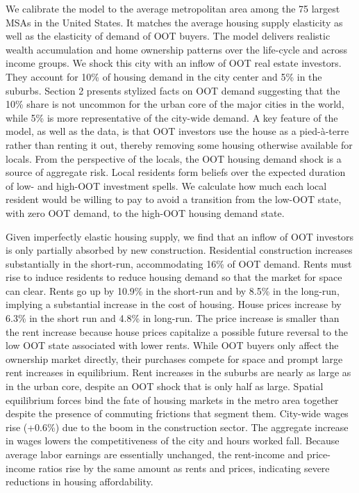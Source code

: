 \documentclass[letterpaper,12pt,dvipsnames,usenames]{article}
\theoremstyle{definition}
\begin{document}
\begin{spacing}{1.25}
We calibrate the model to the average metropolitan area among the 75 largest MSAs in the United States. It matches the average housing supply elasticity as well as the elasticity of demand of OOT buyers. The model delivers realistic wealth accumulation and home ownership patterns over the life-cycle and across income groups. We shock this city with an inflow of OOT real estate investors. They account for 10\% of housing demand in the city center and 5\% in the suburbs. Section 2 presents stylized facts on OOT demand suggesting that the 10\% share is not uncommon for the urban core of the major cities in the world, while 5\% is more representative of the city-wide demand. A key feature of the model, as well as the data, is that OOT investors use the house as a pied-\`a-terre rather than renting it out, thereby removing some housing otherwise available for locals. From the perspective of the locals, the OOT housing demand shock is a source of aggregate risk. Local residents form beliefs over the expected duration of low- and high-OOT investment spells. We calculate how much each local resident would be willing to pay to avoid  a transition from the low-OOT state, with zero OOT demand, to the high-OOT housing demand state.

Given imperfectly elastic housing supply, we find that an inflow of OOT investors is only partially absorbed by new construction. Residential construction increases substantially in the short-run, accommodating 16\% of OOT demand. Rents must rise to induce residents to reduce housing demand so that the market for space can clear. Rents go up by 10.9\% in the short-run and by 8.5\% in the long-run, implying a substantial increase in the cost of housing. House prices increase by 6.3\% in the short run and 4.8\% in long-run. The price increase is smaller than the rent increase because house prices capitalize a possible future reversal to the low OOT state associated with lower rents. While OOT buyers only affect the ownership market directly, their purchases compete for space and prompt large rent increases in equilibrium. Rent increases in the suburbs are nearly as large as in the urban core, despite an OOT shock that is only half as large. Spatial equilibrium forces bind the fate of housing markets in the metro area together despite the presence of commuting frictions that segment them. City-wide wages rise (+0.6\%) due to the boom in the construction sector. The aggregate increase in wages lowers the competitiveness of the city and hours worked fall. Because average labor earnings are essentially unchanged,  the rent-income and price-income ratios rise by the same amount as rents and prices, indicating severe reductions in housing affordability.


\end{spacing}
\end{document}
